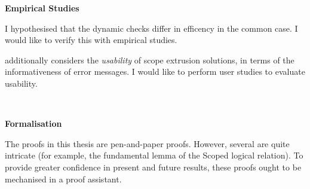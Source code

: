 \noindent\begin{minipage}[t]{0.25\textwidth}
  \textbf{\textsf{Empirical Studies}}
\end{minipage}%
\begin{minipage}[t]{0.75\textwidth}
  I hypothesised that the dynamic checks differ in efficency in the common case. I would like to verify this with empirical studies.
  \vspace{2mm}

  \citet{kiselyov-14} additionally considers the \textit{usability} of scope extrusion solutions, in terms of the informativeness of error messages. I would like to perform user studies to evaluate usability.
  \vspace{4mm}
\end{minipage}\\

\noindent\begin{minipage}[t]{0.25\textwidth}
  \textbf{\textsf{Formalisation}}
\end{minipage}%
\begin{minipage}[t]{0.75\textwidth}
  The proofs in this thesis are pen-and-paper proofs. However, several are quite intricate (for example, the fundamental lemma of the \textsf{Scoped} logical relation). To provide greater confidence in present and future results, these proofs ought to be mechanised in a proof assistant.
\end{minipage}







